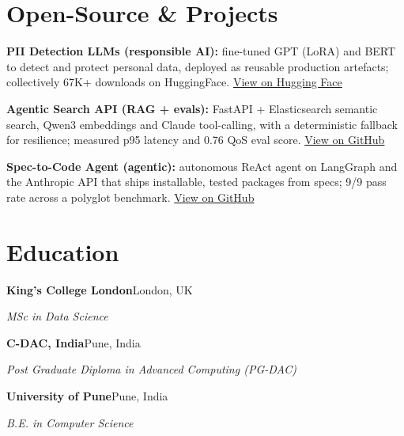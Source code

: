 \documentclass[10pt,a4paper]{article}
\begin{document}
\section{Open-Source \& Projects}
\begin{tight}
  \item \textbf{PII Detection LLMs (responsible AI):} fine-tuned GPT (LoRA) and BERT to detect and protect personal data, deployed as reusable production artefacts; collectively 67K+ downloads on HuggingFace. \href{https://huggingface.co/ab-ai/pii_model}{View on Hugging Face}
  \item \textbf{Agentic Search API (RAG + evals):} FastAPI + Elasticsearch semantic search, Qwen3 embeddings and Claude tool-calling, with a deterministic fallback for resilience; measured p95 latency and 0.76 QoS eval score. \href{https://github.com/abhijeetscode/search-agent}{View on GitHub}
  \item \textbf{Spec-to-Code Agent (agentic):} autonomous ReAct agent on LangGraph and the Anthropic API that ships installable, tested packages from specs; 9/9 pass rate across a polyglot benchmark. \href{https://github.com/abhijeetscode/Spec-to-Code-Agent}{View on GitHub}
\end{tight}

\section{Education}
{\color{company}\bfseries King's College London}\hfill {\color{muted}London, UK}\par
{\itshape MSc in Data Science}\par\vspace{2pt}
{\color{company}\bfseries C-DAC, India}\hfill {\color{muted}Pune, India}\par
{\itshape Post Graduate Diploma in Advanced Computing (PG-DAC)}\par\vspace{2pt}
{\color{company}\bfseries University of Pune}\hfill {\color{muted}Pune, India}\par
{\itshape B.E. in Computer Science}\par
\end{document}
